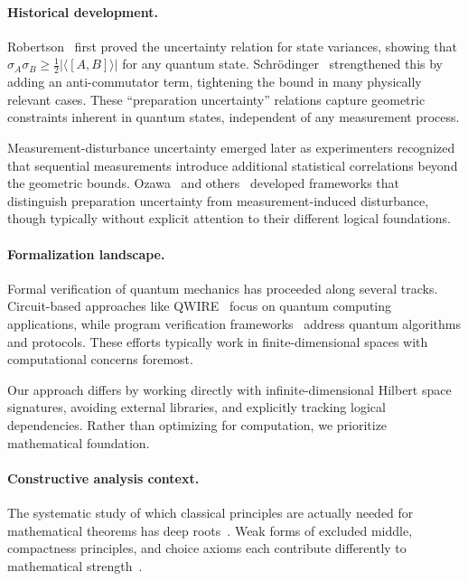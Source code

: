 \documentclass[11pt]{article}
\theoremstyle{plain}
\theoremstyle{definition}
\theoremstyle{remark}
\begin{document}
\paragraph{Historical development.}
Robertson~\cite{Robertson1929} first proved the uncertainty relation for state variances, showing that $\sigma_A \sigma_B \geq \frac{1}{2}|\langle[A,B]\rangle|$ for any quantum state. Schrödinger~\cite{Schrodinger1930} strengthened this by adding an anti-commutator term, tightening the bound in many physically relevant cases. These ``preparation uncertainty'' relations capture geometric constraints inherent in quantum states, independent of any measurement process.

Measurement-disturbance uncertainty emerged later as experimenters recognized that sequential measurements introduce additional statistical correlations beyond the geometric bounds. Ozawa~\cite{Ozawa2003} and others~\cite{BuschLahtiWerner2014} developed frameworks that distinguish preparation uncertainty from measurement-induced disturbance, though typically without explicit attention to their different logical foundations.

\paragraph{Formalization landscape.}
Formal verification of quantum mechanics has proceeded along several tracks. Circuit-based approaches like QWIRE~\cite{QWIRE2017} focus on quantum computing applications, while program verification frameworks~\cite{Ying2016} address quantum algorithms and protocols. These efforts typically work in finite-dimensional spaces with computational concerns foremost.

Our approach differs by working directly with infinite-dimensional Hilbert space signatures, avoiding external libraries, and explicitly tracking logical dependencies. Rather than optimizing for computation, we prioritize mathematical foundation.

\paragraph{Constructive analysis context.}
The systematic study of which classical principles are actually needed for mathematical theorems has deep roots~\cite{BishopBridges,BridgesRichman,TroelstraVanDalen}. Weak forms of excluded middle, compactness principles, and choice axioms each contribute differently to mathematical strength~\cite{HowardRubin}.
\end{document}

